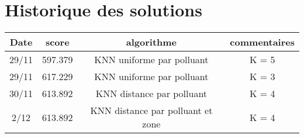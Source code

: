 \section*{Historique des solutions}

\begin{tabular}{|c|c|c|c|}
  \hline
  Date & score & algorithme & commentaires \\
  \hline
  29/11 & 597.379 & KNN uniforme par polluant& K = 5\\
  \hline
  29/11 & 617.229 & KNN uniforme par polluant& K = 3\\
  \hline
  30/11 & 613.892 & KNN distance par polluant & K = 4\\
  \hline
  2/12 & 613.892 & KNN distance par polluant et zone & K = 4\\
  \hline
\end{tabular}
